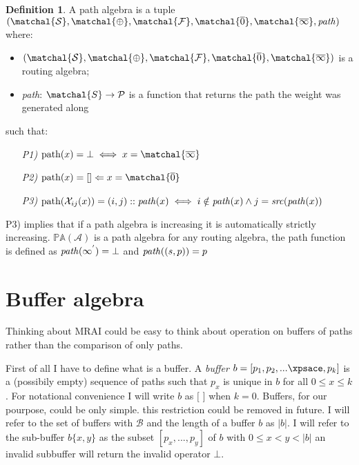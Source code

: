 \documentclass[10pt,conference,letterpaper]{IEEEtran}
\theoremstyle{definition}
\newtheorem{definition}{Definition}
\theoremstyle{remark}
\newcommand{\semiringset}{\ensuremath{\matchal{S}}\xspace}
\newcommand{\semiringchoice}{\ensuremath{\matchal{\oplus}}\xspace}
\newcommand{\semiringfunctions}{\ensuremath{\matchal{F}}\xspace}
\newcommand{\semiringempty}{\ensuremath{\matchal{\overline{\rm 0}}}\xspace}
\newcommand{\semiringinvalid}{\ensuremath{\matchal{\overline{\rm \infty}}}\xspace}
\newcommand{\semiring}{\ensuremath{\mathcal{(\semiringset, \semiringchoice, \semiringfunctions, \semiringempty, \semiringinvalid)}}\xspace}
\newcommand{\Amatrix}{\ensuremath{\mathcal{X}}\xspace}
\newcommand{\Amatrixelem}{\ensuremath{\Amatrix_{ij}}\xspace}
\newcommand{\invalidpath}{\ensuremath{\mathcal{\bot}}\xspace}
\newcommand{\pathset}{\ensuremath{\mathcal{P}}\xspace}
\newcommand{\pathalgebrashort}[1]{\ensuremath{\mathcal{\mathbb{P}\mathbb{A}(#1)}}\xspace}
\newcommand{\semiringpath}{\ensuremath{\mathcal{(\semiringset, \semiringchoice, \semiringfunctions, \semiringempty, \semiringinvalid, \text{\textit{path}})}}\xspace}
\begin{document}
\theoremstyle{definition}
\begin{definition}
	A path algebra is a tuple \semiringpath where:
	\begin{itemize}
			\item \semiring is a routing algebra;
			\item \textit{path}: $\semiringset \rightarrow \pathset$ is a 
				function that returns the path the weight was generated along
	\end{itemize}
	such that:
	\begin{itemize}
		\item[\textit{P1)}] $\text{path}(x) = \invalidpath \iff x = \semiringinvalid$
		\item[\textit{P2)}] $\text{path}(x) = [] \Leftarrow x = \semiringempty$
		\item[\textit{P3)}] $\text{path}(\Amatrixelem(x)) = (i,j) :: \text{\textit{path}}(x) \iff i \notin \text{\textit{path}}(x) \land j = \text{\textit{src}}(\text{\textit{path}}(x))$
	\end{itemize}
\end{definition}

P3) implies that if a path algebra is increasing it is automatically strictly 
increasing.
\pathalgebrashort{A} is a path algebra for any routing algebra,
the path function is defined as $\text{\textit{path}}(\infty^{'}) = \invalidpath$
and $\text{\textit{path}}((s,p)) = p$

\section{Buffer algebra}
\label{sec:buffer}

Thinking about \ac{MRAI} could be easy to think about operation on buffers of paths
rather than the comparison of only paths.

First of all I have to define what is a buffer.
A \textit{buffer} $b = [p_1, p_2, \xspace ... \xpsace, p_k]$ is a (possibily empty)
sequence of paths such that $p_x$ is unique in $b$ for all $ 0 \leq x \leq k$.
For notational convenience I will write $b$ as $[$ $]$ when $k = 0$.
Buffers, for our pourpose, could be only simple.
this restriction could be removed in future.
I will refer to the set of buffers with $\mathcal{B}$ and the length of a buffer $b$
as $|b|$.
I will refer to the sub-buffer $b\{x,y\}$ as the subset $[p_x, \xspace ... \xspace, p_y]$
of $b$ with $0 \leq x < y < |b|$ an invalid subbuffer will return the invalid operator \invalidpath.
\end{document}
